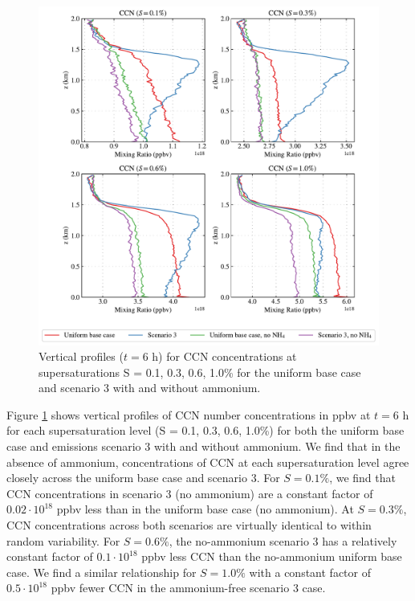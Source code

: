 \begin{figure}[!t]
  \centering
    \includegraphics[width=\textwidth]{figures/chapter5/aerosol-ccn-vertical-profiles-no-nh4-cases-time36.pdf}
    \caption{Vertical profiles ($t = 6$ h) for CCN concentrations at supersaturations S = 0.1, 0.3, 0.6, 1.0\% for the uniform base case and scenario 3 with and without ammonium.}
    \label{fig:vert-profiles-ccn-no-nh4}
\end{figure}

Figure \ref{fig:vert-profiles-ccn-no-nh4} shows vertical profiles of CCN number concentrations in ppbv at $t=6$ h for each supersaturation level (S = 0.1, 0.3, 0.6, 1.0\%) for both the uniform base case and emissions scenario 3 with and without ammonium. We find that in the absence of ammonium, concentrations of CCN at each supersaturation level agree closely across the uniform base case and scenario 3. For $S=0.1\%$, we find that CCN concentrations in scenario 3 (no ammonium) are a constant factor of $0.02\cdot10^{18}$ ppbv less than in the uniform base case (no ammonium). At $S=0.3\%$, CCN concentrations across both scenarios are virtually identical to within random variability. For $S=0.6\%$, the no-ammonium scenario 3 has a relatively constant factor of $0.1\cdot10^{18}$ ppbv less CCN than the no-ammonium uniform base case. We find a similar relationship for $S=1.0\%$ with a constant factor of $0.5\cdot10^{18}$ ppbv fewer CCN in the ammonium-free scenario 3 case. 

